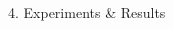 \documentclass[final]{beamer}
\renewcommand{\normalsize}{\fontsize{18}{22}\selectfont}
\begin{document}
\begin{frame}[t]
\begin{columns}[t,totalwidth=\textwidth]
\begin{column}{0.35\textwidth}
\begin{block}{4. Experiments \& Results}
   \vspace{0.5cm}


\end{block}
\end{column}
\end{columns}
\end{frame}
\end{document}
